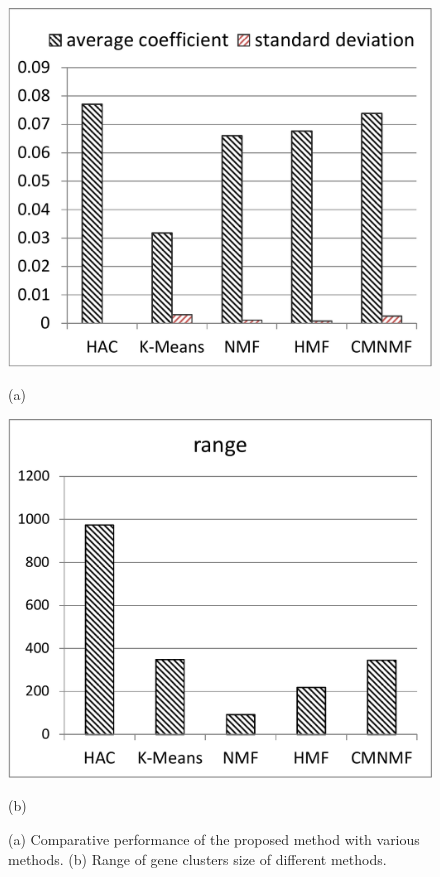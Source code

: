 \documentclass{bmcart}
\begin{document}
\begin{figure}
  \centering
  \begin{minipage}{.45\linewidth}
    \includegraphics[width=\linewidth]{fig/jaccard.pdf}
    \centerline{(a)}
  \end{minipage}
  \begin{minipage}{.45\linewidth}
   \includegraphics[width=\linewidth]{fig/range.pdf}
    \centerline{(b)}
  \end{minipage}
  \caption{(a) Comparative performance of the proposed method with various methods. (b) Range of gene clusters size of different methods.}
  \label{fig:jaccard}
\end{figure}
\end{document}
